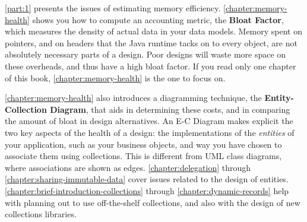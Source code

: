 \autoref{part:1} presents the issues of estimating memory efficiency.
\autoref{chapter:memory-health} shows you how to compute an accounting metric,
the \textbf{Bloat Factor}, which measures the density of actual data in your
data models. Memory spent on pointers, and on headers that the Java runtime
tacks on to every object, are not absolutely necessary parts of a design. Poor
designs will waste more space on these overheads, and thus have a high bloat
factor. If you read only one chapter of this book,
\autoref{chapter:memory-health} is the one to focus on.

\autoref{chapter:memory-health} also introduces a diagramming technique, the
\textbf{Entity-Collection Diagram}, that aids in determining these costs, and in
comparing the amount of bloat in design alternatives.
An E-C Diagram makes explicit the two key aspects of the health of a design:
the implementations of the \emph{entities} of your application, such as your
business objects, and way you have chosen to associate them using collections.
This is different from UML class diagrams, where associations are shown as
edges.
\autoref{chapter:delegation} through
\autoref{chapter:sharing-immutable-data} cover issues related to the design of
entities.
\autoref{chapter:brief-introduction-collections} through
\autoref{chapter:dynamic-records} help with planning out to use off-the-shelf
collections, and also with the design of new collections libraries.

